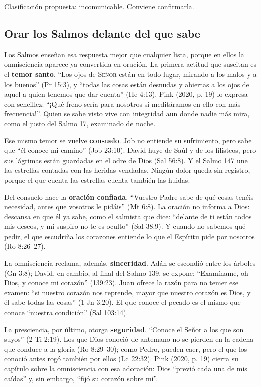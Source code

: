 \documentclass[11pt,letterpaper]{article}
\newcommand{\SENOR}{\textsc{Señor}}
\newcommand{\destacar}[1]{\textbf{\textcolor{azul}{#1}}}
\begin{document}
\begin{nota}[Precisión]
Clasificación propuesta: incomunicable. Conviene confirmarla.
\end{nota}

\subsection{Orar los Salmos delante del que sabe}
Los Salmos enseñan esa respuesta mejor que cualquier lista, porque en ellos la omnisciencia aparece ya convertida en oración. La primera actitud que suscitan es el \destacar{temor santo}. ``Los ojos de \SENOR{} están en todo lugar, mirando a los malos y a los buenos'' (Pr 15:3), y ``todas las cosas están desnudas y abiertas a los ojos de aquel a quien tenemos que dar cuenta'' (He 4:13). Pink (2020, p. 19) lo expresa con sencillez: ``¡Qué freno sería para nosotros si meditáramos en ello con más frecuencia!''. Quien se sabe visto vive con integridad aun donde nadie más mira, como el justo del Salmo 17, examinado de noche.

Ese mismo temor se vuelve \destacar{consuelo}. Job no entiende su sufrimiento, pero sabe que ``él conoce mi camino'' (Job 23:10). David huye de Saúl y de los filisteos, pero sus lágrimas están guardadas en el odre de Dios (Sal 56:8). Y el Salmo 147 une las estrellas contadas con las heridas vendadas. Ningún dolor queda sin registro, porque el que cuenta las estrellas cuenta también las huidas.

Del consuelo nace la \destacar{oración confiada}. ``Vuestro Padre sabe de qué cosas tenéis necesidad, antes que vosotros le pidáis'' (Mt 6:8). La oración no informa a Dios: descansa en que él ya sabe, como el salmista que dice: ``delante de ti están todos mis deseos, y mi suspiro no te es oculto'' (Sal 38:9). Y cuando no sabemos qué pedir, el que escudriña los corazones entiende lo que el Espíritu pide por nosotros (Ro 8:26--27).

La omnisciencia reclama, además, \destacar{sinceridad}. Adán se escondió entre los árboles (Gn 3:8); David, en cambio, al final del Salmo 139, se expone: ``Examíname, oh Dios, y conoce mi corazón'' (139:23). Juan ofrece la razón para no temer ese examen: ``si nuestro corazón nos reprende, mayor que nuestro corazón es Dios, y él sabe todas las cosas'' (1 Jn 3:20). El que conoce el pecado es el mismo que conoce ``nuestra condición'' (Sal 103:14).

La presciencia, por último, otorga \destacar{seguridad}. ``Conoce el Señor a los que son suyos'' (2 Ti 2:19). Los que Dios conoció de antemano no se pierden en la cadena que conduce a la gloria (Ro 8:29--30); como Pedro, pueden caer, pero el que los conoció antes rogó también por ellos (Lc 22:32). Pink (2020, p. 19) cierra su capítulo sobre la omnisciencia con esa adoración: Dios ``previó cada una de mis caídas'' y, sin embargo, ``fijó su corazón sobre mí''.
\end{document}
